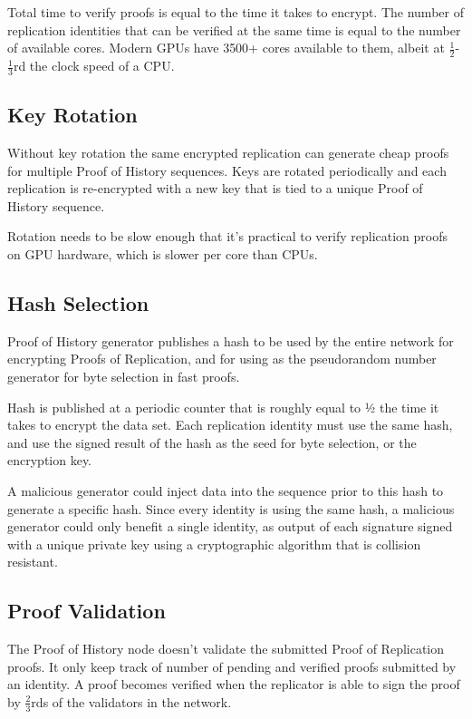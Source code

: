 \documentclass[12pt]{article}
\begin{document}
Total time to verify proofs is equal to the time it takes to encrypt.  The number of replication identities that can be verified at the same time is equal to the number of available cores.  Modern GPUs have 3500+ cores available to them, albeit at \(\frac{1}{2}\)-\(\frac{1}{3}\)rd the clock speed of a CPU.

\subsection{Key Rotation}

Without key rotation the same encrypted replication can generate cheap proofs for multiple Proof of History sequences.  Keys are rotated periodically and each replication is re-encrypted with a new key that is tied to a unique Proof of History sequence.

Rotation needs to be slow enough that it’s practical to verify replication proofs on GPU hardware, which is slower per core than CPUs.

\subsection{Hash Selection}

Proof of History generator publishes a hash to be used by the entire network for encrypting Proofs of Replication, and for using as the pseudorandom number generator for byte selection in fast proofs.

Hash is published at a periodic counter that is roughly equal to ½ the time it takes to encrypt the data set.  Each replication identity must use the same hash, and use the signed result of the hash as the seed for byte selection, or the encryption key.

A malicious generator could inject data into the sequence prior to this hash to generate a specific hash.  Since every identity is using the same hash, a malicious generator could only benefit a single identity, as output of each signature signed with a unique private key using a cryptographic algorithm that is collision resistant.

\subsection{Proof Validation}
The Proof of History node doesn’t validate the submitted Proof of Replication proofs.  It only keep track of number of pending and verified proofs submitted by an identity.  A proof becomes verified when the replicator is able to sign the proof by \(\frac{2}{3}\)rds of the validators in the network.  
\end{document}
